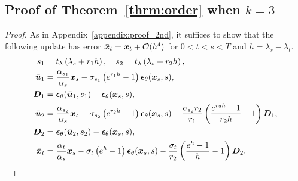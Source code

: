 \subsection{Proof of Theorem~\ref{thrm:order} when $k=3$}
\label{appendix:proof_3rd}
\begin{proof}
As in Appendix~\ref{appendix:proof_2nd}, it suffices to show that the following update has error $\bar {\bm{x}}_t = \bm{x}_t + \mathcal O(h^4)$ for $0 < t < s < T$ and $h = \lambda_s - \lambda_t$.
\begin{subequations}
\begin{align}
    s_{1} &= t_\lambda\left(\lambda_s + r_1 h\right),\quad s_{2} = t_\lambda\left(\lambda_{s} + r_2 h\right), \\
    \bar {\bm{u}}_{1} &=\frac{\alpha_{s_{1}}}{\alpha_{s}} \bm{x}_{s} - \sigma_{s_{1}}\left(e^{r_1 h} - 1\right)\bm{\epsilon}_\theta( \bm{x}_{s},s), \\
    \bm{D}_{1} &= \bm{\epsilon}_\theta(\bar {\bm{u}}_{1},s_{1}) - \bm{\epsilon}_\theta(\bm{x}_{s},s), \\
    \bar {\bm{u}}_{2} &= \frac{\alpha_{s_{2}}}{\alpha_{s}} \bm{x}_{s}  
    - \sigma_{s_{2}}\left(e^{r_2 h} - 1\right)\bm{\epsilon}_\theta(\bm{x}_{s},s) - \frac{\sigma_{s_{2}}r_2}{r_1}\left( \frac{e^{r_2 h} - 1}{r_2 h} - 1\right)\bm{D}_{1}, \\
    \bm{D}_{2} &= \bm{\epsilon}_\theta(\bar {\bm{u}}_{2},s_{2}) - \bm{\epsilon}_\theta(\bm{x}_{s},s), \\
    \bar {\bm{x}}_{t} &= \frac{\alpha_{t}}{\alpha_{s}} \bm{x}_{s}
        - \sigma_{t}\left(e^{h} - 1\right)\bm{\epsilon}_\theta(\bm{x}_{s},s) - \frac{\sigma_{t}}{r_2}\left( \frac{e^{h} - 1}{h} - 1\right)\bm{D}_{2}.
\end{align}
\end{subequations}


\end{proof}
